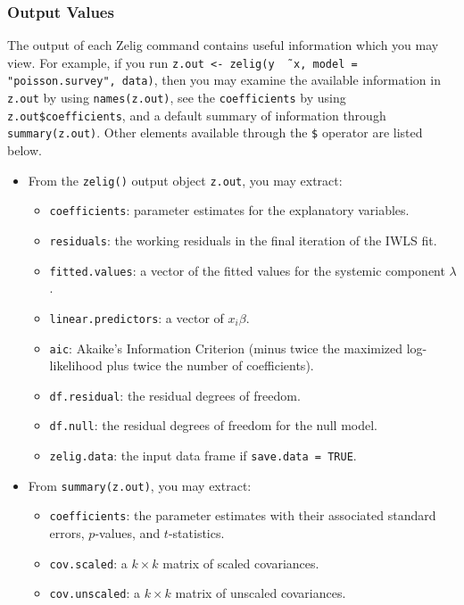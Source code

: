 \subsubsection{Output Values}

The output of each Zelig command contains useful information which you
may view.  For example, if you run \texttt{z.out <- zelig(y \~\,
  x, model = "poisson.survey", data)}, then you may examine the available
information in \texttt{z.out} by using \texttt{names(z.out)},
see the {\tt coefficients} by using {\tt z.out\$coefficients}, and
a default summary of information through \texttt{summary(z.out)}.
Other elements available through the {\tt \$} operator are listed
below.

\begin{itemize}
\item From the {\tt zelig()} output object {\tt z.out}, you may extract:
   \begin{itemize}
   \item {\tt coefficients}: parameter estimates for the explanatory
     variables.
   \item {\tt residuals}: the working residuals in the final iteration
     of the IWLS fit.
   \item {\tt fitted.values}: a vector of the fitted values for the systemic
     component $\lambda$.  
   \item {\tt linear.predictors}: a vector of $x_{i}\beta$.  
   \item {\tt aic}: Akaike's Information Criterion (minus twice the
     maximized log-likelihood plus twice the number of coefficients).
   \item {\tt df.residual}: the residual degrees of freedom.
   \item {\tt df.null}: the residual degrees of freedom for the null
     model.
   \item {\tt zelig.data}: the input data frame if {\tt save.data = TRUE}.  
   \end{itemize}

\item From {\tt summary(z.out)}, you may extract: 
   \begin{itemize}
   \item {\tt coefficients}: the parameter estimates with their
     associated standard errors, $p$-values, and $t$-statistics.
   \item{\tt cov.scaled}: a $k \times k$ matrix of scaled covariances.
   \item{\tt cov.unscaled}: a $k \times k$ matrix of unscaled
     covariances.  
   \end{itemize}


\end{itemize}
